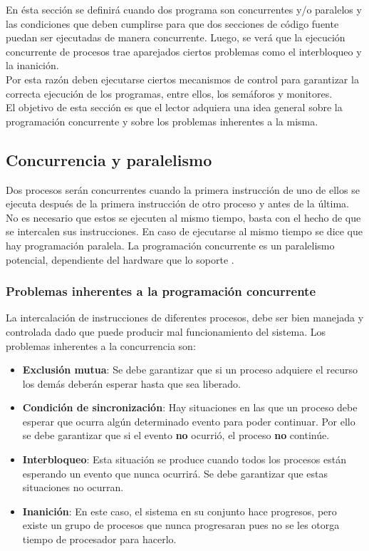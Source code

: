 \par En ésta sección se definirá cuando dos programa son concurrentes y/o paralelos y las condiciones que deben cumplirse para que dos secciones de código fuente puedan ser ejecutadas de manera concurrente. Luego, se verá que la ejecución concurrente de procesos trae aparejados ciertos problemas como el interbloqueo y la inanición.\\
Por esta razón deben ejecutarse ciertos mecanismos de control para garantizar la correcta ejecución de los programas, entre ellos, los semáforos y monitores.\\
El objetivo de esta sección es que el lector adquiera una idea general sobre la programación concurrente y sobre los problemas inherentes a la misma.

\subsection{Concurrencia y paralelismo}
Dos procesos serán concurrentes cuando la primera instrucción de uno de ellos se ejecuta después de la primera instrucción de otro proceso y antes de la última.
No es necesario que estos se ejecuten al mismo tiempo, basta con el hecho de que se intercalen sus instrucciones. En caso de ejecutarse al mismo tiempo se dice que hay programación paralela.
La programación concurrente es un paralelismo potencial, dependiente del hardware que lo soporte  \cite{mendez}.

\subsubsection{Problemas inherentes a la programación concurrente}
La intercalación de instrucciones de diferentes procesos, debe ser bien manejada y controlada dado que puede producir mal funcionamiento del sistema. Los problemas inherentes a la concurrencia son:
\begin{itemize}
    \item \textbf{Exclusión mutua}: Se debe garantizar que si un proceso adquiere el recurso los demás deberán esperar hasta que sea liberado.

    \item \textbf{Condición de sincronización}: Hay situaciones en las que un proceso debe esperar que ocurra algún determinado evento para poder continuar. Por ello se debe garantizar que si el evento \textbf{no} ocurrió, el proceso \textbf{no} continúe. 
    
    \item \textbf{Interbloqueo}: Esta situación se produce cuando todos los procesos están esperando un evento que nunca ocurrirá. Se debe garantizar que estas situaciones no ocurran.
    
    \item \textbf{Inanición}: En este caso, el sistema en su conjunto hace progresos, pero existe un grupo de procesos que nunca progresaran pues no se les otorga tiempo de procesador para hacerlo.
\end{itemize}

